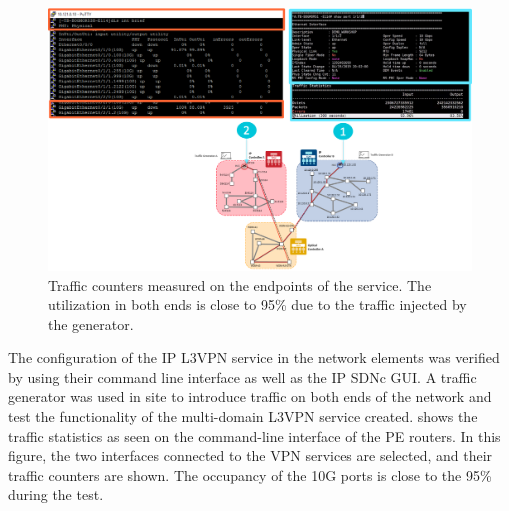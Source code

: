 \documentclass[a4paper,fleqn]{cas-dc}
\begin{document}
\begin{figure}
	\centering
		\includegraphics[width=\linewidth]{figs/counters.png}
	\caption{Traffic counters measured on the endpoints of the service. The utilization in both ends is close to 95\% due to the traffic injected by the generator.}
	\label{FIG:counters}
\end{figure}

The configuration of the IP L3VPN service in the network elements was verified by using their command line interface as well as the IP SDNc GUI. A traffic generator was used in site to introduce traffic on both ends of the network and test the functionality of the multi-domain L3VPN service created.  shows the traffic statistics as seen on the command-line interface of the PE routers. In this figure, the two interfaces connected to the VPN services are selected, and their traffic counters are shown. The occupancy of the 10G ports is close to the 95\% during the test. 
\end{document}
